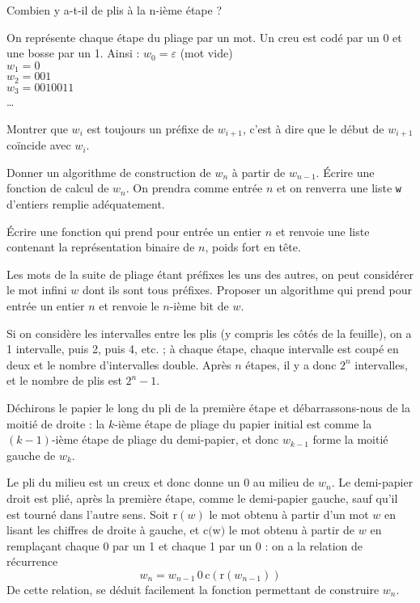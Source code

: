 \Q
Combien y a-t-il de plis à la n-ième étape ?

\Q
On représente chaque étape du pliage par un mot. Un creu est codé par un 0 et une bosse par un 1. Ainsi : $w_0=\varepsilon$ (mot vide)\\
$w_1=0$\\
$w_2=001$\\
$w_3=0010011$\\
\dots
\medskip

Montrer que $w_i$ est toujours un préfixe de $w_{i+1}$, c'est à dire que le début de $w_{i+1}$ coïncide avec $w_i$.

\Q
Donner un algorithme de construction de $w_n$ à partir de $w_{n-1}$. Écrire une fonction de calcul de $w_n$. On prendra comme entrée $n$ et on renverra une liste \texttt{w} d'entiers remplie adéquatement.

\Q
Écrire une fonction qui prend pour entrée un entier $n$ et renvoie une liste contenant la représentation binaire de $n$, poids fort en tête.

\Q
Les mots de la suite de pliage étant préfixes les uns des autres, on peut considérer le mot infini $w$ dont ils sont tous préfixes. Proposer un algorithme qui prend pour entrée un entier $n$ et renvoie le $n$-ième bit de $w$.

\Corrige

\Q
Si on considère les intervalles entre les plis (y compris les côtés de la feuille), on a 1 intervalle, puis 2, puis 4, etc. ; à chaque étape, chaque intervalle est coupé en deux et le nombre d'intervalles double. Après $n$ étapes, il y a donc $2^n$ intervalles, et le nombre de plis est $2^n-1$.

\Q
Déchirons le papier le long du pli de la première étape et débarrassons-nous de la moitié de droite : la $k$-ième étape de pliage du papier initial est comme la $(k-1)$-ième étape de pliage du demi-papier, et donc $w_{k-1}$ forme la moitié gauche de $w_k$.

\Q
Le pli du milieu est un creux et donc donne un 0 au milieu de $w_n$. Le demi-papier droit est plié, après la première étape, comme le demi-papier gauche, sauf qu'il est tourné dans l'autre sens. Soit $\textrm{r}(w)$ le mot obtenu à partir d'un mot $w$ en lisant les chiffres de droite à gauche, et $\textrm{c(w)}$ le mot obtenu à partir de $w$ en remplaçant chaque 0 par un 1 et chaque 1 par un 0 : on a la relation de récurrence
\[
    w_n = w_{n-1}\,0\,\textrm{c}(\textrm{r}(w_{n-1}))
\]
De cette relation, se déduit facilement la fonction permettant de construire $w_n$.

